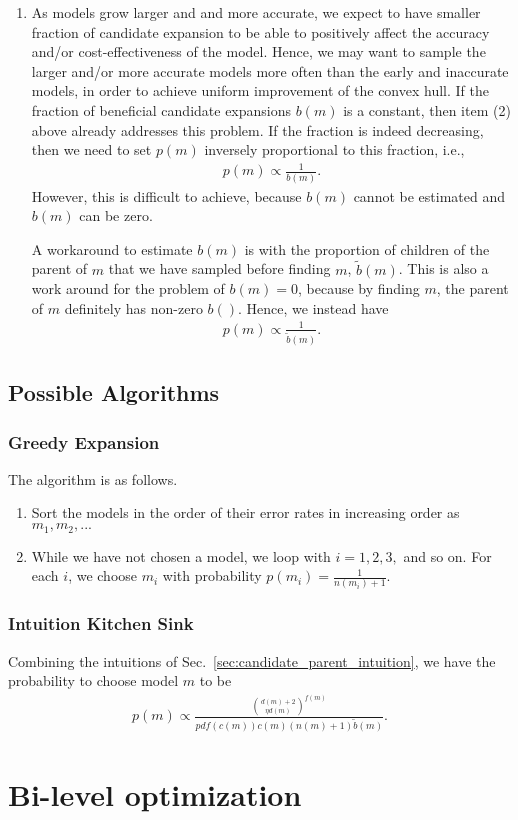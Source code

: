 \begin{enumerate}
\item

As models grow larger and and more accurate, we expect to have smaller fraction of candidate expansion to be able to positively affect the accuracy and/or cost-effectiveness of the model. Hence, we may want to sample the larger and/or more accurate models more often than the early and inaccurate models, in order to achieve uniform improvement of the convex hull. If the fraction of beneficial candidate expansions $b(m)$ is a constant, then item (2) above already addresses this problem. If the fraction is indeed decreasing, then we need to set $p(m)$  inversely proportional to this fraction, i.e.,
\begin{align}
    p(m) \propto \frac{1}{b(m)}.
\end{align} 
However, this is difficult to achieve, because $b(m)$ cannot be estimated and $b(m)$ can be zero. 

A workaround to estimate $b(m)$ is with the proportion of children of the parent of $m$ that we have sampled before finding $m$, $\tilde{b}(m)$. This is also a work around for the problem of $b(m) = 0$, because by finding $m$, the parent of $m$ definitely has non-zero $b()$. 
Hence, we instead have 
\begin{align}
    p(m) \propto \frac{1}{\tilde{b}(m)}.
\end{align}

\end{enumerate}


\subsection{Possible Algorithms}

\subsubsection{Greedy Expansion}
The algorithm is as follows.
\begin{enumerate}
    \item Sort the models in the order of their error rates in increasing order as $m_1, m_2,...$
    \item While we have not chosen a model, we loop with $i =1,2,3,$ and so on. For each $i$, we choose $m_i$ with probability $p(m_i) = \frac{1}{n(m_i) + 1}$. 
\end{enumerate}

\subsubsection{Intuition Kitchen Sink}
Combining the intuitions of Sec.~\ref{sec:candidate_parent_intuition}, we have the probability to choose model $m$ to be 
\begin{align}
    p(m) \propto \frac{ {d(m) + 2 \choose \eta d(m) }^{f(m)} }{pdf(c(m)) c(m) (n(m) + 1) \tilde{b}(m)  }.
\end{align}


\section{Bi-level optimization}
\label{sec:nas_bi_level_optimization}


%
